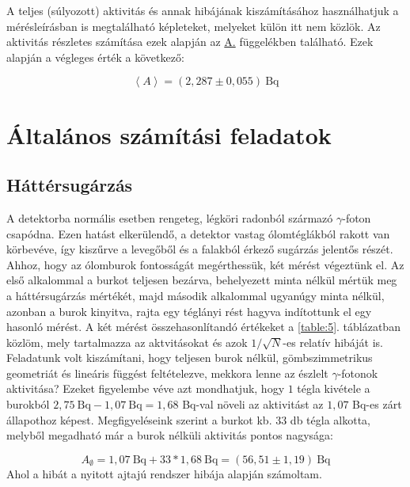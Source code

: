 \begin{multicols}{2}
A teljes (súlyozott) aktivitás és annak hibájának kiszámításához használhatjuk a mérésleírásban is megtalálható képleteket, melyeket külön itt nem közlök. Az aktivitás részletes számítása ezek alapján az \hyperref[appendix:A]{A.} függelékben található. Ezek alapján a végleges érték a következő:

\begin{equation}
\left< A \right>
=
\left( 2,287 \pm 0,055 \right)\ \text{Bq} 
\end{equation}


\section{Általános számítási feladatok}
\subsection{Háttérsugárzás}
A detektorba normális esetben rengeteg, légköri radonból származó $\gamma$-foton csapódna. Ezen hatást elkerülendő, a detektor vastag ólomtéglákból rakott  van körbevéve, így kiszűrve a levegőből  és a falakból érkező sugárzás jelentős részét. Ahhoz, hogy az ólomburok fontosságát megérthessük, két mérést végeztünk el. Az első alkalommal a burkot teljesen bezárva, behelyezett minta nélkül mértük meg a háttérsugárzás mértékét, majd második alkalommal ugyanúgy minta nélkül, azonban a burok  kinyitva, rajta egy téglányi rést hagyva indítottunk el egy hasonló mérést. \newline
A két mérést összehasonlítandó értékeket a \ref{table:5}. táblázatban közlöm, mely tartalmazza az aktvitásokat és azok $1/\sqrt{N}$-es relatív hibáját is. Feladatunk volt kiszámítani, hogy teljesen burok nélkül, gömbszimmetrikus geometriát és lineáris függést feltételezve, mekkora lenne az észlelt $\gamma$-fotonok aktivitása? Ezeket figyelembe véve azt mondhatjuk, hogy $1$ tégla kivétele a burokból $2,75\ \text{Bq} - 1,07\ \text{Bq} = 1,68$ Bq-val növeli az aktivitást az $1,07$ Bq-es zárt állapothoz képest. Megfigyeléseink szerint a burkot kb. $33$ db tégla alkotta, melyből megadható már a burok nélküli aktivitás pontos nagysága:

\begin{equation}
A_{\emptyset}
=
1,07\ \text{Bq} + 33 * 1,68\ \text{Bq}
=
\left( 56,51 \pm 1,19 \right)\ \text{Bq}
\end{equation}
Ahol a hibát a nyitott ajtajú rendszer hibája alapján számoltam.

\end{multicols}